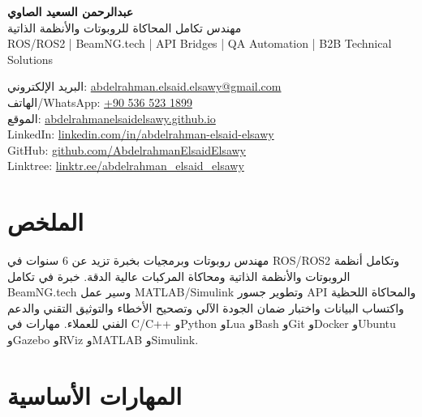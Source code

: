 \documentclass[11pt,a4paper]{article}
\newcommand{\en}[1]{\textenglish{#1}}
\begin{document}
{\LARGE \textbf{عبدالرحمن السعيد الصاوي}}\\
مهندس تكامل المحاكاة للروبوتات والأنظمة الذاتية\\
\en{ROS/ROS2} | \en{BeamNG.tech} | \en{API Bridges} | \en{QA Automation} | \en{B2B Technical Solutions}

البريد الإلكتروني: \href{mailto:abdelrahman.elsaid.elsawy@gmail.com}{\en{abdelrahman.elsaid.elsawy@gmail.com}}\\
الهاتف/\en{WhatsApp}: \href{https://wa.me/905365231899}{\en{+90 536 523 1899}}\\
الموقع: \href{https://abdelrahmanelsaidelsawy.github.io/index.html}{\en{abdelrahmanelsaidelsawy.github.io}}\\
\en{LinkedIn}: \href{https://www.linkedin.com/in/abdelrahman-elsaid-elsawy}{\en{linkedin.com/in/abdelrahman-elsaid-elsawy}}\\
\en{GitHub}: \href{https://github.com/AbdelrahmanElsaidElsawy}{\en{github.com/AbdelrahmanElsaidElsawy}}\\
\en{Linktree}: \href{https://linktr.ee/abdelrahman_elsaid_elsawy}{\en{linktr.ee/abdelrahman\_elsaid\_elsawy}}

\section*{الملخص}

مهندس روبوتات وبرمجيات بخبرة تزيد عن 6 سنوات في \en{ROS/ROS2} وتكامل أنظمة الروبوتات والأنظمة الذاتية ومحاكاة المركبات عالية الدقة. خبرة في تكامل \en{BeamNG.tech} وسير عمل \en{MATLAB/Simulink} وتطوير جسور \en{API} والمحاكاة اللحظية واكتساب البيانات واختبار ضمان الجودة الآلي وتصحيح الأخطاء والتوثيق التقني والدعم الفني للعملاء. مهارات في \en{C/C++} و\en{Python} و\en{Lua} و\en{Bash} و\en{Git} و\en{Docker} و\en{Ubuntu} و\en{Gazebo} و\en{RViz} و\en{MATLAB} و\en{Simulink}.

\section*{المهارات الأساسية}
\end{document}
